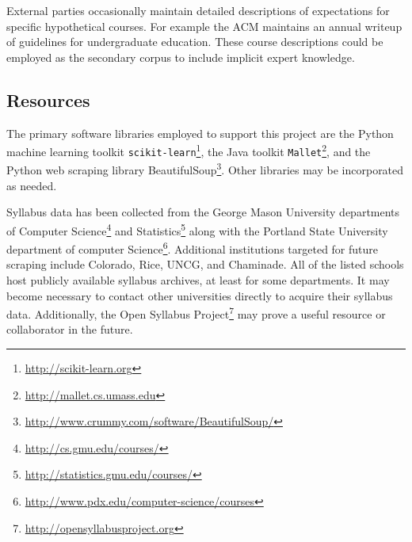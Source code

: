 External parties occasionally maintain detailed descriptions of
expectations for specific hypothetical courses. For example the ACM
maintains an annual writeup of guidelines for undergraduate education.
\cite{CS2013} These course descriptions could be employed as the secondary
corpus to include implicit expert knowledge.


\subsection{Resources}

The primary software libraries employed to support this project are the
Python machine learning toolkit
\texttt{scikit-learn}\footnote{\url{http://scikit-learn.org}}, the Java
toolkit \texttt{Mallet}\footnote{\url{http://mallet.cs.umass.edu}}, and the
Python web scraping library
BeautifulSoup\footnote{\url{http://www.crummy.com/software/BeautifulSoup/}}.
Other libraries may be incorporated as needed.

Syllabus data has been collected from the George Mason University
departments of Computer Science\footnote{\url{http://cs.gmu.edu/courses/}}
and Statistics\footnote{\url{http://statistics.gmu.edu/courses/}} along
with the Portland State University department of computer
Science\footnote{\url{http://www.pdx.edu/computer-science/courses}}.
Additional institutions targeted for future scraping include Colorado,
Rice, UNCG, and Chaminade. All of the listed schools host publicly
available syllabus archives, at least for some departments. It may become
necessary to contact other universities directly to acquire their syllabus
data. Additionally, the Open Syllabus
Project\footnote{\url{http://opensyllabusproject.org}} may prove a useful
resource or collaborator in the future.

